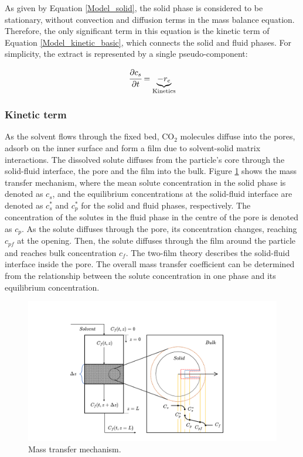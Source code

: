 \documentclass[a4paper,fleqn]{cas-dc}
\begin{document}
As given by Equation \ref{Model_solid}, the solid phase is considered to be stationary, without convection and diffusion terms in the mass balance equation. Therefore, the only significant term in this equation is the kinetic term of Equation \ref{Model_kinetic_basic}, which connects the solid and fluid phases. For simplicity, the extract is represented by a single pseudo-component: 

{\footnotesize
	\begin{equation} 
		\label{Model_solid}
				\cfrac{\partial c_s}{\partial t} = \underbrace{ -  r_e }_{\text{Kinetics}}
		\end{equation} }
		
		\subsubsection{Kinetic term} \label{CH: Kinetic}
		
		As the solvent flows through the fixed bed, CO$_2$ molecules diffuse into the pores, adsorb on the inner surface and form a film due to solvent-solid matrix interactions. The dissolved solute diffuses from the particle's core through the solid-fluid interface, the pore and the film into the bulk. Figure \ref{fig: SFE_Mechanism} shows the mass transfer mechanism, where the mean solute concentration in the solid phase is denoted as $c_s$, and the equilibrium concentrations at the solid-fluid interface are denoted as $c_s^*$ and $c_p^*$ for the solid and fluid phases, respectively. The concentration of the solutes in the fluid phase in the centre of the pore is denoted as $c_p$. As the solute diffuses through the pore, its concentration changes, reaching $c_{pf}$ at the opening. Then, the solute diffuses through the film around the particle and reaches bulk concentration $c_f$. The two-film theory describes the solid-fluid interface inside the pore. The overall mass transfer coefficient can be determined from the relationship between the solute concentration in one phase and its equilibrium concentration.
		
		\begin{figure}[h!]
			\centering
			\includegraphics[trim = 45cm 0cm 60cm 20cm,clip,width=0.85\columnwidth]{Figures/SFE_PFD.drawio.png}	
			\caption{Mass transfer mechanism.}
			\label{fig: SFE_Mechanism}
		\end{figure}
		
\end{document}
